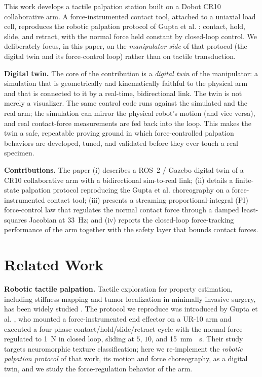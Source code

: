 \documentclass[conference]{IEEEtran}
\begin{document}
This work develops a tactile palpation station built on a Dobot CR10
collaborative arm. A force-instrumented contact tool, attached to
a uniaxial load cell, reproduces the robotic palpation protocol of Gupta et al.
\cite{gupta2021}: contact, hold, slide, and retract, with the normal force held
constant by closed-loop control. We deliberately focus, in this paper, on the
\emph{manipulator side} of that protocol (the digital twin and its
force-control loop) rather than on tactile transduction.

\textbf{Digital twin.} The core of the contribution is a \emph{digital twin} of
the manipulator: a simulation that is geometrically and kinematically faithful
to the physical arm and that is connected to it by a real-time, bidirectional
link. The twin is not merely a visualizer. The same control code runs against
the simulated and the real arm; the simulation can mirror the physical robot's
motion (and vice versa), and real contact-force measurements are fed back into
the loop. This makes the twin a safe, repeatable proving ground in which
force-controlled palpation behaviors are developed, tuned, and validated before
they ever touch a real specimen.

\textbf{Contributions.} The paper (i) describes a ROS~2 / Gazebo digital twin of
a CR10 collaborative arm with a bidirectional sim-to-real link; (ii) details a
finite-state palpation protocol reproducing the Gupta et al. choreography on a
force-instrumented contact tool; (iii) presents a streaming
proportional-integral (PI) force-control law that regulates the normal contact
force through a damped least-squares Jacobian at \SI{33}{\hertz}; and (iv)
reports the closed-loop force-tracking performance of the arm together with the
safety layer that bounds contact forces.

\section{Related Work}
\textbf{Robotic tactile palpation.} Tactile exploration for property estimation,
including stiffness mapping and tumor localization in minimally invasive
surgery, has been widely studied \cite{konstantinova2014,beccani2014}. The protocol we
reproduce was introduced by Gupta et al. \cite{gupta2021}, who mounted a
force-instrumented end effector on a UR-10 arm and executed a four-phase
contact/hold/slide/retract cycle with the normal force regulated to
\SI{1}{\newton} in closed loop, sliding at $5$, $10$, and \SI{15}{\milli\meter
\per\second}. Their study targets neuromorphic texture classification; here we
re-implement the \emph{robotic palpation protocol} of that work, its motion and
force choreography, as a digital twin, and we study the force-regulation
behavior of the arm.
\end{document}
